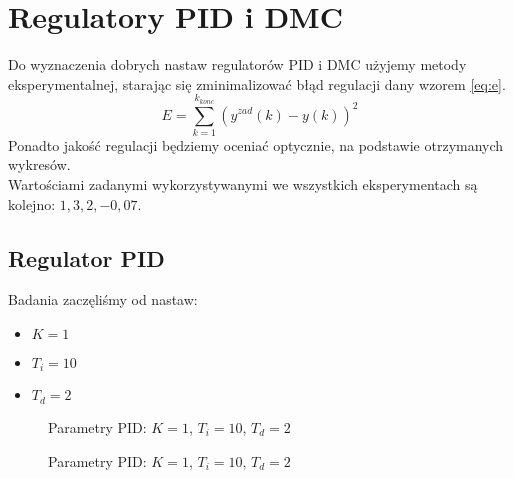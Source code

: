 \chapter{Regulatory PID i DMC}
Do wyznaczenia dobrych nastaw regulatorów PID i DMC użyjemy metody eksperymentalnej, starając się zminimalizować błąd regulacji dany wzorem \ref{eq:e}.
\begin{equation} \label{eq:e}
E = \sum_{k=1}^{k_{konc}} (y^{zad}(k)-y(k))^2
\end{equation}
Ponadto jakość regulacji będziemy oceniać optycznie, na podstawie otrzymanych wykresów. \\
Wartościami zadanymi wykorzystywanymi we wszystkich eksperymentach są kolejno: $1,3,2,-0,07$.

\section{Regulator PID}
Badania zaczęliśmy od nastaw:
\begin{itemize}
\item $K=1$
\item $T_i=10$
\item $T_d=2$
\end{itemize}

\begin{figure}[H]
\centering
{}
\caption{Parametry PID: $K=1$, $T_i=10$, $T_d=2$}
\label{fig:pid1_y}
\end{figure}

\begin{figure}[H]
\centering
{}
\caption{Parametry PID: $K=1$, $T_i=10$, $T_d=2$}
\label{fig:pid1_u}
\end{figure}

